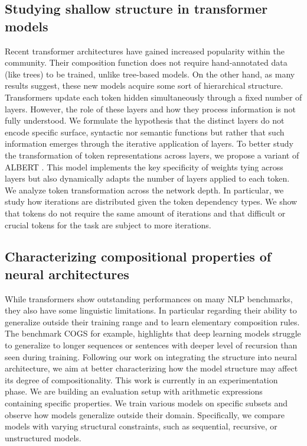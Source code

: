 \subsection{Studying shallow structure in transformer models}

Recent transformer architectures have gained increased popularity within the community. Their composition function does not require hand-annotated data (like trees) to be trained, unlike tree-based models. On the other hand, as many results suggest, these new models acquire some sort of hierarchical structure. Transformers update each token hidden simultaneously through a fixed number of layers. However, the role of these layers and how they process information is not fully understood. We formulate the hypothesis that the distinct layers do not encode specific surface, syntactic nor semantic functions but rather that such information emerges through the iterative application of layers. To better study the transformation of token representations across layers, we propose a variant of ALBERT \parencite{simoulin_2021b}. This model implements the key specificity of weights tying across layers but also dynamically adapts the number of layers applied to each token. We analyze token transformation across the network depth. In particular, we study how iterations are distributed given the token dependency types. We show that tokens do not require the same amount of iterations and that difficult or crucial tokens for the task are subject to more iterations.

\subsection{Characterizing compositional properties of neural architectures}

While transformers show outstanding performances on many NLP benchmarks, they also have some linguistic limitations. In particular regarding their ability to generalize outside their training range and to learn elementary composition rules. The benchmark COGS \parencite{kim_20} for example, highlights that deep learning models struggle to generalize to longer sequences or sentences with deeper level of recursion than seen during training. Following our work on integrating the structure into neural architecture, we aim at better characterizing how the model structure may affect its degree of compositionality. This work is currently in an experimentation phase. We are building an evaluation setup with arithmetic expressions containing specific properties. We train various models on specific subsets and observe how models generalize outside their domain. Specifically, we compare models with varying structural constraints, such as sequential, recursive, or unstructured models.

